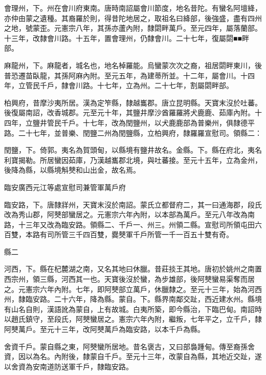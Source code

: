 \begin{pinyinscope}
 會理州，下。州在會川府東南。唐時南詔屬會川節度，地名昔陀。有蠻名阿壇絳，亦仲由蒙之遺種。其裔羅於則，得昔陀地居之，取祖名曰絳部，後強盛，盡有四州之地，號蒙歪。元憲宗八年，其孫亦蘆內附，隸閟畔萬戶。至元四年，屬落蘭部。十三年，改隸會川路。十五年，置會理州，仍隸會川。二十七年，復屬閟■■畔部。



 麻龍州，下。麻龍者，城名也，地名棹羅能。烏蠻蒙次次之裔，祖居閟畔東川，後普恐遷苗臥龍，其孫阿麻內附。至元五年，為建蒂所並。十二年，屬會川。十四年，立管民千戶，隸會川路。十七年，立為州。二十七年，割屬閟畔部。



 柏興府，昔摩沙夷所居。漢為定笮縣，隸越巂郡。唐立昆明縣。天寶末沒於吐蕃。後復屬南詔，改香城郡。元至元十年，其鹽井摩沙酋羅羅將犬鹿鹿、茹庫內附。十四年，立鹽井管民千戶。十七年，改為閏鹽州，以犬鹿鹿部為普樂州，俱隸德平路。二十七年，並普樂、閏鹽二州為閏鹽縣，立柏興府，隸羅羅宣慰司。領縣二：



 閏鹽，下。倚郭。夷名為賀頭甸，以縣境有鹽井故名。金縣。下。縣在府北，夷名利寶揭勒。所居蠻因茹庫，乃漢越巂郡北境，與吐蕃接。至元十五年，立為金州，後降為縣，以縣境斛僰和山出金，故名焉。



 臨安廣西元江等處宣慰司兼管軍萬戶府



 臨安路，下。唐隸牂州，天寶末沒於南詔。蒙氏立都督府二，其一曰通海郡，段氏改為秀山郡，阿僰部蠻居之。元憲宗六年內附，以本部為萬戶。至元八年改為南路，十三年又改為臨安路。領縣二、千戶一、州三。州領二縣。宣慰司所領屯田六百雙，本路有司所管三千四百雙，爨僰軍千戶所管一千一百五十雙有奇。



 縣二



 河西，下。縣在杞麓湖之南，又名其地曰休臘。昔莊掞王其地。唐初於姚州之南置西宗州，領三縣，河西其一也。天寶後沒於蠻，為步雄部，後阿僰蠻易渠奪而居之。元憲宗六年內附。七年，即阿僰部立萬戶，休臘隸之。至元十三年，始為河西州，隸臨安路。二十六年，降為縣。蒙自。下。縣界南鄰交趾，西近建水州。縣境有山名自則，漢語訛為蒙自，上有故城。白夷所築，即今縣治，下臨巴甸。南詔時以趙氏鎮守，至段氏，阿僰蠻居之。憲宗六年內附，繼叛，七年平之，立千戶，隸阿僰萬戶。至元十三年，改阿僰萬戶為臨安路，以本千戶為縣。



 舍資千戶。蒙自縣之東，阿僰蠻所居地。昔名褒古，又曰部裊踵甸。傳至裔孫舍資，因以為名。內附後，隸蒙自千戶。至元十三年，改蒙自為縣，其地近交趾，遂以舍資為安南道防送軍千戶，隸臨安路。




\end{pinyinscope}
